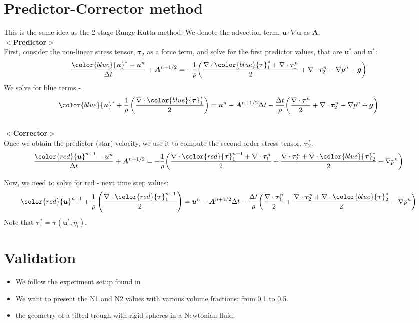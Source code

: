 \section{Predictor-Corrector method}
This is the same idea as the 2-stage Runge-Kutta method. We denote the advection term, ${\bm u} \cdot \nabla {\bm u}$ as ${\bm A}$. 
\\
$<${\bf Predictor}$>$
\\
First, consider the non-linear stress tensor, ${\bm \tau_2}$ as a force term, and solve for the first predictor values, that are ${\bm u}^*$ and ${\bm u}^*$:
\[
\frac{{\color{blue}{\bm u}^*} - {\bm u}^n}{\Delta t} 
+  {\bm A}^{n+1/2} 
=- \frac{1}{\rho}  \biggl(
\frac{\nabla \cdot {\color{blue}{\bm \tau}_1^*} + \nabla \cdot{\bm \tau}_1^n}{2} 
+ \nabla \cdot {\bm \tau}_2^n 
- \nabla p^n
+{\bm g}
\biggr)
\]
We solve for blue terms - 
\[
{\color{blue}{\bm u}^*} +
\frac{1}{\rho} 
\left( 
\frac{\nabla \cdot {\color{blue}{\bm \tau}_1^*}}{2}
\right)
=
{\bm u}^n
- {\bm A}^{n+1/2} \Delta t
- \frac{\Delta t}{\rho} \biggl(
\frac{ \nabla \cdot{\bm \tau}_1^n}{2} 
+ \nabla \cdot {\bm \tau}_2^n 
- \nabla p^n
+{\bm g}
\biggr)
\]
\\
$<${\bf Corrector}$>$
\\
Once we obtain the predictor (star) velocity, we use it to compute the second order stress tensor, ${\bm \tau}_2^*$.
\[
\frac{{\color{red}{\bm u}^{n+1}} - {\bm u}^n}{\Delta t} 
+  {\bm A}^{n+1/2} 
=- \frac{1}{\rho}  \biggl(
\frac{\nabla \cdot {\color{red}{\bm \tau}_1^{n+1}} + \nabla \cdot{\bm \tau}_1^n}{2} 
+ \frac{\nabla \cdot {\bm \tau}_2^{n} + \nabla \cdot {\color{blue}{\bm \tau}_2^*}}{2} 
- \nabla p^n
\biggr)
\]

Now, we need to solve for red - next time step values:
\[
{\color{red}{\bm u}^{n+1}} 
+\frac{1}{\rho} 
\left(
\frac{\nabla \cdot {\color{red}{\bm \tau}_1^{n+1}}}{2}
\right)
=
{\bm u}^n 
 -{\bm A}^{n+1/2} \Delta t
- \frac{\Delta t}{\rho}  \biggl(
\frac{ \nabla \cdot{\bm \tau}_1^n}{2} 
+ \frac{\nabla \cdot {\bm \tau}_2^{n} + \nabla \cdot {\color{blue}{\bm \tau}_2^*}}{2} 
- \nabla p^n
\biggr)
\]
Note that ${\bm \tau}_i^* = {\bm \tau}({\bm u}^*, \eta_i)$.
\section{Validation}
\begin{itemize}
  \item We follow the experiment setup found in \cite{couturier_suspensions_2011}
  \item We want to present the N1 and N2 values with various volume fractions: from 0.1 to 0.5.
  \item the geometry of a tilted trough with rigid spheres in a Newtonian fluid. 
\end{itemize}


